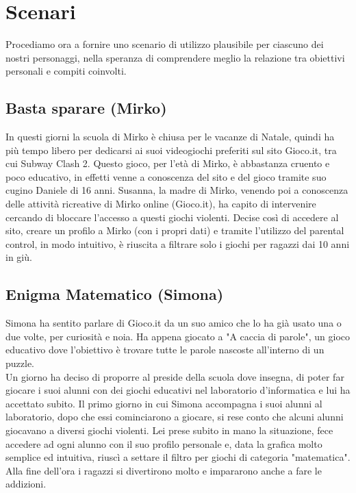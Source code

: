 \documentclass[../Report.tex]{subfiles}
\begin{document}
    \section{Scenari}
    Procediamo ora a fornire uno scenario di utilizzo plausibile per ciascuno dei nostri personaggi, nella speranza di comprendere meglio la relazione tra obiettivi personali e compiti coinvolti.

    \subsection{Basta sparare (Mirko)}
    In questi giorni la scuola di Mirko è chiusa per le vacanze di Natale, quindi ha più tempo libero per dedicarsi ai suoi videogiochi preferiti sul sito Gioco.it, tra cui Subway Clash 2. Questo gioco, per l'età di Mirko, è abbastanza cruento e poco educativo, in effetti venne a conoscenza del sito e del gioco tramite suo cugino Daniele di 16 anni. Susanna, la madre di Mirko, venendo poi a conoscenza delle attività ricreative di Mirko online (Gioco.it), ha capito di intervenire cercando di bloccare l'accesso a questi giochi violenti. Decise così di accedere al sito, creare un profilo a Mirko (con i propri dati) e tramite l'utilizzo del parental control, in modo intuitivo, è riuscita a filtrare solo i giochi per ragazzi dai 10 anni in giù.

    \subsection{Enigma Matematico (Simona)}
    Simona ha sentito parlare di Gioco.it da un suo amico che lo  ha già usato una o due volte, per curiosità e noia. Ha appena giocato a "A caccia di parole", un gioco educativo dove l'obiettivo è trovare tutte le parole nascoste all'interno di un puzzle.\\
    Un giorno ha deciso di proporre al preside della scuola dove insegna, di poter far giocare i suoi alunni con dei giochi educativi nel laboratorio d'informatica e lui ha accettato subito. Il primo giorno in cui Simona accompagna i suoi alunni al laboratorio, dopo che essi cominciarono a giocare, si rese conto che alcuni alunni giocavano a diversi giochi violenti. Lei prese subito in mano la situazione, fece accedere ad ogni alunno con il suo profilo personale e, data la grafica molto semplice ed intuitiva, riuscì a settare il filtro per giochi di categoria "matematica". Alla fine dell'ora i ragazzi si divertirono molto e impararono anche a fare le addizioni.
\end{document}
